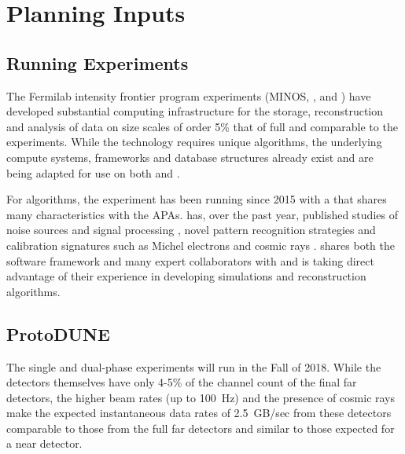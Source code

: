  
\section{Planning Inputs}


\subsection{Running Experiments}\label{sw:IF-input}

The Fermilab intensity frontier program experiments (MINOS\cite{minosNIM},  \cite{minerva}, \cite{microboone} and  \cite{Adamson:2016xxw}) have developed substantial computing infrastructure for the storage, reconstruction and analysis of data on size scales of order 5\% that of full   and comparable to the  experiments. While the \lartpc technology requires unique algorithms, the underlying compute systems, frameworks and database structures already exist and are being adapted for use on both  and  .

For algorithms, the  \cite{Acciarri:2016smi} experiment has been running since 2015 with a \lartpc that shares many characteristics with the   APAs.     has, over the past year, published studies of noise sources and signal processing \cite{Acciarri:2017sde,Adams:2018dra}, novel pattern recognition strategies \cite{Acciarri:2016ryt,Acciarri:2017hat} and calibration signatures such as Michel electrons and cosmic rays \cite{Acciarri:2017sjy,Acciarri:2017sde}.    shares both the \larsoft software framework and many expert collaborators with   and is taking direct advantage of their experience in developing simulations and reconstruction algorithms.


\subsection{ProtoDUNE}\label{sw:PD-planning}

The  single and dual-phase experiments will run in the Fall of 2018.  While the detectors themselves have only 4-5\% of the channel count  of the final far detectors, the higher beam rates (up to 100~Hz) and the presence of cosmic rays make the expected instantaneous data rates of 2.5~GB/sec from these detectors comparable to those from the full far detectors and similar to those expected for a near detector. 

